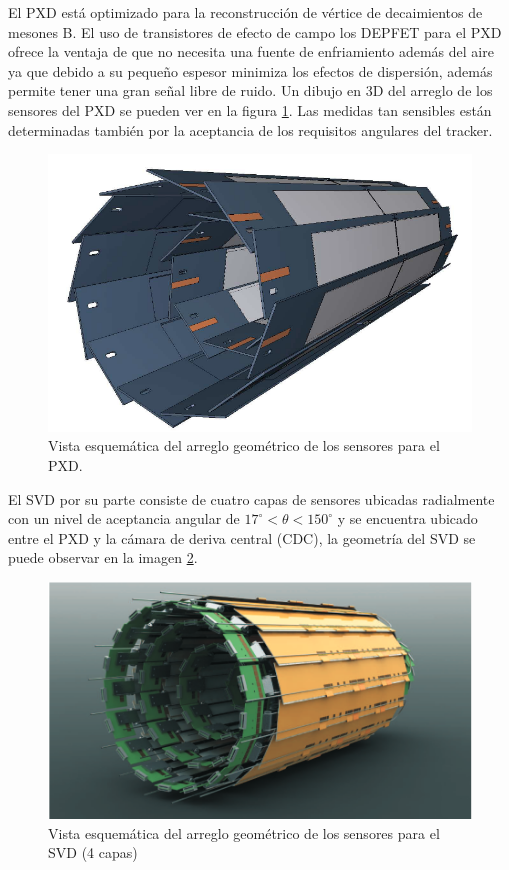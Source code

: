 El PXD está optimizado para la reconstrucción de vértice de decaimientos de mesones B. El uso de transistores de efecto de campo los DEPFET para el PXD ofrece la ventaja de que no necesita una fuente de enfriamiento además del aire ya que debido a su pequeño espesor minimiza los efectos de dispersión, además permite tener una gran señal libre de ruido. Un dibujo en 3D del arreglo de los sensores del PXD se pueden ver en la figura \ref{fig:pxd}. Las medidas tan sensibles están determinadas también por la aceptancia de los requisitos angulares del tracker.
\begin{figure}[h]
    \centering
    \includegraphics[scale=.4]{Images/pxd.png}
    \caption{\small Vista esquemática del arreglo geométrico de los sensores para el PXD.}
    \label{fig:pxd}
\end{figure}

El SVD por su parte consiste de cuatro capas de sensores ubicadas radialmente con un nivel de aceptancia angular de \(17^{\circ}<\theta<150^{\circ}\) y se encuentra ubicado entre el PXD y la cámara de deriva central (CDC), la geometría del SVD se puede observar en la imagen \ref{fig:svd}.

\begin{figure}[h]
    \centering
    \includegraphics[scale=.4]{Images/svd.png}
    \caption{\small Vista esquemática del arreglo geométrico de los sensores para el SVD (4 capas)}
    \label{fig:svd}
\end{figure}

